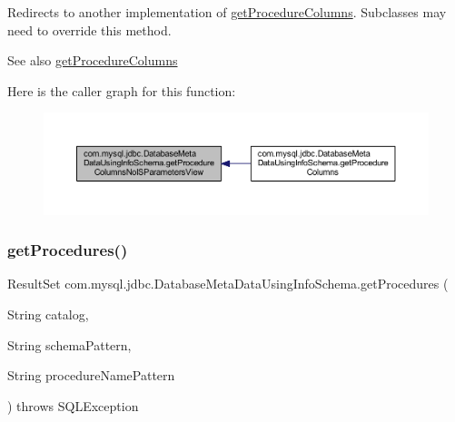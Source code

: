 Redirects to another implementation of \mbox{\hyperlink{classcom_1_1mysql_1_1jdbc_1_1_database_meta_data_using_info_schema_a2bb17e6501848d501ed65ee886ed4225}{get\+Procedure\+Columns}}. Subclasses may need to override this method.

\begin{DoxySeeAlso}{See also}
\mbox{\hyperlink{classcom_1_1mysql_1_1jdbc_1_1_database_meta_data_using_info_schema_a2bb17e6501848d501ed65ee886ed4225}{get\+Procedure\+Columns}} 
\end{DoxySeeAlso}
Here is the caller graph for this function\+:
\nopagebreak
\begin{figure}[H]
\begin{center}
\leavevmode
\includegraphics[width=350pt]{classcom_1_1mysql_1_1jdbc_1_1_database_meta_data_using_info_schema_a39f4d86800a2ecfb0e22a88485a92aae_icgraph}
\end{center}
\end{figure}
\mbox{\label{classcom_1_1mysql_1_1jdbc_1_1_database_meta_data_using_info_schema_a1f2fd58fdf545dc23641793c4035f91d}} 
\subsubsection{\texorpdfstring{get\+Procedures()}{getProcedures()}}
{\footnotesize\ttfamily Result\+Set com.\+mysql.\+jdbc.\+Database\+Meta\+Data\+Using\+Info\+Schema.\+get\+Procedures (\begin{DoxyParamCaption}\item[{String}]{catalog,  }\item[{String}]{schema\+Pattern,  }\item[{String}]{procedure\+Name\+Pattern }\end{DoxyParamCaption}) throws S\+Q\+L\+Exception}

